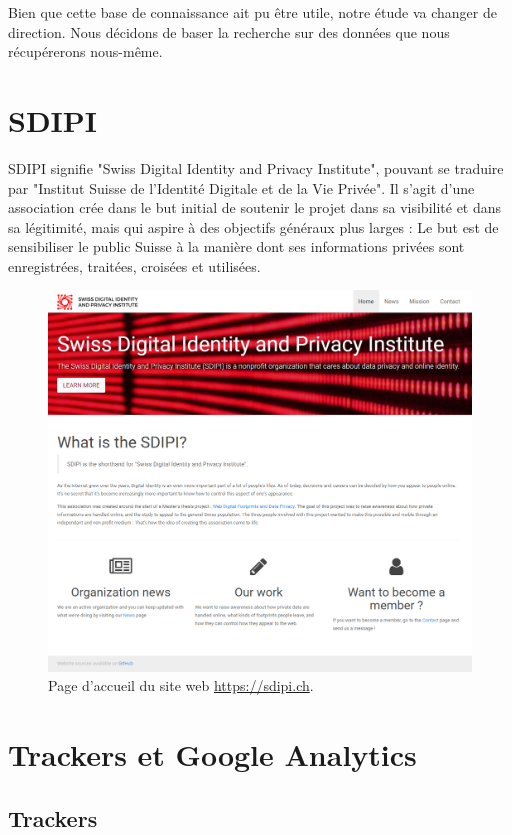 		Bien que cette base de connaissance ait pu être utile, notre étude va changer de direction. Nous décidons de baser la recherche sur des données que nous récupérerons nous-même.

\section{SDIPI}

	SDIPI signifie "Swiss Digital Identity and Privacy Institute", pouvant se traduire par "Institut Suisse de l'Identité Digitale et de la Vie Privée". Il s'agit d'une association crée dans le but initial de soutenir le projet dans sa visibilité et dans sa légitimité, mais qui aspire à des objectifs généraux plus larges : Le but est de sensibiliser le public Suisse à la manière dont ses informations privées sont  enregistrées, traitées, croisées et utilisées.

	\begin{figure}[h]
		\centering
		\includegraphics[width=1\textwidth]{images/design/sdipi_home}
		\caption{Page d'accueil du site web \url{https://sdipi.ch}.}
		\label{a-sdipi}
	\end{figure}


\section{Trackers et Google Analytics}

	\subsection{Trackers}

